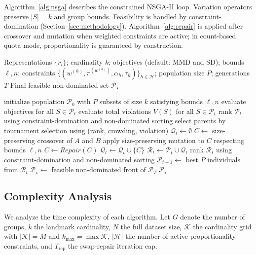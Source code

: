 \documentclass[10pt,journal]{IEEEtran}
\newcommand{\1}{\mathbf{1}}
\theoremstyle{ieeethm}
\begin{document}
Algorithm~\ref{alg:nsga} describes the constrained NSGA-II loop. Variation operators preserve $|S|=k$ and group bounds. Feasibility is handled by constraint-domination (Section~\ref{sec:methodology}). Algorithm~\ref{alg:repair} is applied after crossover and mutation when weighted constraints are active; in count-based quota mode, proportionality is guaranteed by construction.

\begin{algorithm}[t]
\caption{Constrained NSGA-II for (MMD, SD) with KL Constraints}
\label{alg:nsga}
\begin{algorithmic}[1]
\Require
Representations $\{r_i\}$; cardinality $k$;
objectives (default: MMD and SD);
bounds $\ell,n$;
constraints $\{(w^{(h)},\pi^{(w^{(h)})},\alpha_h,\tau_h)\}_{h\in\mathcal{H}}$;
population size $P$; generations $T$
\Ensure
Final feasible non-dominated set $\mathcal{P}_\star$

\State initialize population $\mathcal{P}_0$ with $P$ subsets of size $k$ satisfying bounds $\ell,n$
    \State evaluate objectives for all $S\in\mathcal{P}_t$
    \State evaluate total violations $V(S)$ for all $S\in\mathcal{P}_t$
    \State rank $\mathcal{P}_t$ using constraint-domination and non-dominated sorting
    \State select parents by tournament selection using (rank, crowding, violation)
    \State $\mathcal{Q}_t \gets \emptyset$
        \State $C \gets$ size-preserving crossover of $A$ and $B$
        \State apply size-preserving mutation to $C$ respecting bounds $\ell,n$
        \State $C \gets Repair(C)$
        \State $\mathcal{Q}_t \gets \mathcal{Q}_t \cup \{C\}$
    \EndFor
    \State $\mathcal{R}_t \gets \mathcal{P}_t \cup \mathcal{Q}_t$
    \State rank $\mathcal{R}_t$ using constraint-domination and non-dominated sorting
    \State $\mathcal{P}_{t+1}\gets$ best $P$ individuals from $\mathcal{R}_t$
\EndFor
\State $\mathcal{P}_\star \gets$ feasible non-dominated front of $\mathcal{P}_T$
\State \Return $\mathcal{P}_\star$
\end{algorithmic}
\end{algorithm}

\endgroup

\subsection{Complexity Analysis}
\label{subsec:complexity}

We analyze the time complexity of each algorithm. Let $G$ denote the number of
groups, $k$ the landmark cardinality, $N$ the full dataset size, $\mathcal{K}$
the cardinality grid with $|\mathcal{K}|=M$ and $k_{\max}=\max\mathcal{K}$,
$|\mathcal{H}|$ the number of active proportionality constraints, and
$T_{\mathrm{rep}}$ the swap-repair iteration cap.
\end{document}
